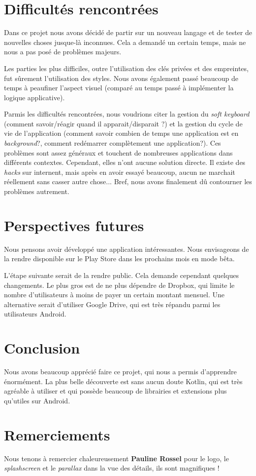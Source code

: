 \section{Difficultés rencontrées}

Dans ce projet nous avons décidé de partir sur un nouveau langage et de tester de nouvelles choses jusque-là inconnues. Cela a demandé un certain temps, mais ne nous a pas posé de problèmes majeurs.

Les parties les plus difficiles, outre l'utilisation des clés privées et des empreintes, fut sûrement l'utilisation des styles. Nous avons également passé beaucoup de temps à peaufiner l'aspect visuel (comparé au temps passé à implémenter la logique applicative).

Parmis les difficultés rencontrées, nous voudrions citer la gestion du \emph{soft keyboard} (comment savoir/réagir quand il apparait/disparait ?) et la gestion du cycle de vie de l'application (comment savoir combien de temps une application est en \emph{background}?, comment redémarrer complètement une application?). Ces problèmes sont assez généraux et touchent de nombreuses applications dans différents contextes. Cependant, elles n'ont aucune solution directe. Il existe des \emph{hacks} sur internent, mais après en avoir essayé beaucoup, aucun ne marchait réellement sans casser autre chose... Bref, nous avons finalement dû contourner les problèmes autrement. 

\section{Perspectives futures}

Nous pensons avoir développé une application intéressantes. Nous envisageons de la rendre disponible sur le Play Store dans les prochains mois en mode bêta. 

L'étape suivante serait de la rendre public. Cela demande cependant quelques changements. Le plus gros est de ne plus dépendre de Dropbox, qui limite le nombre d'utilisateurs à moins de payer un certain montant mensuel. Une alternative serait d'utiliser Google Drive, qui est très répandu parmi les utilisateurs Android.

\section{Conclusion}

Nous avons beaucoup apprécié faire ce projet, qui nous a permis d'apprendre énormément. La plus belle découverte est sans aucun doute Kotlin, qui est très agréable à utiliser et qui possède beaucoup de librairies et extensions plus qu'utiles sur Android.

\section*{Remerciements}

Nous tenons à remercier chaleureusement \textbf{Pauline Rossel} pour le logo, le \emph{splashscreen} et le \emph{parallax} dans la vue des détails, ils sont magnifiques !